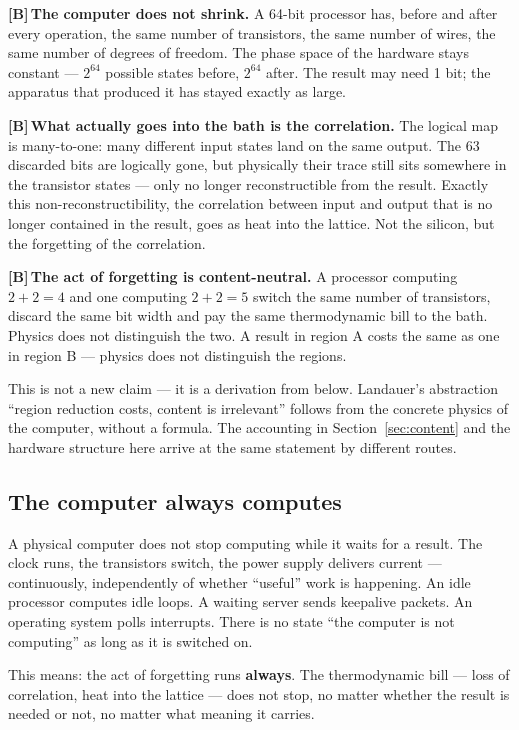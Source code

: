 \documentclass[11pt,a4paper]{article}
\newcommand{\LB}{\textcolor{layB}{\textbf{\footnotesize\textsf{[B]}}}\,}
\begin{document}
\LB \textbf{The computer does not shrink.} A 64-bit processor has, before and
after every operation, the same number of transistors, the same number of wires,
the same number of degrees of freedom. The phase space of the hardware stays
constant --- $2^{64}$ possible states before, $2^{64}$ after. The result may need
1 bit; the apparatus that produced it has stayed exactly as large.

\LB \textbf{What actually goes into the bath is the correlation.} The logical map
is many-to-one: many different input states land on the same output. The 63
discarded bits are logically gone, but physically their trace still sits somewhere
in the transistor states --- only no longer reconstructible from the result.
Exactly this non-reconstructibility, the correlation between input and output that
is no longer contained in the result, goes as heat into the lattice. Not the
silicon, but the forgetting of the correlation.

\LB \textbf{The act of forgetting is content-neutral.} A processor computing
$2+2=4$ and one computing $2+2=5$ switch the same number of transistors, discard
the same bit width and pay the same thermodynamic bill to the bath. Physics does
not distinguish the two. A result in region A costs the same as one in region B
--- physics does not distinguish the regions.

This is not a new claim --- it is a derivation from below. Landauer's abstraction
“region reduction costs, content is irrelevant” follows from the concrete physics
of the computer, without a formula. The accounting in Section~\ref{sec:content}
and the hardware structure here arrive at the same statement by different routes.

\subsection{The computer always computes}
\label{sec:always}

A physical computer does not stop computing while it waits for a result. The clock
runs, the transistors switch, the power supply delivers current --- continuously,
independently of whether “useful” work is happening. An idle processor computes
idle loops. A waiting server sends keepalive packets. An operating system polls
interrupts. There is no state “the computer is not computing” as long as it is
switched on.

This means: the act of forgetting runs \textbf{always}. The thermodynamic bill ---
loss of correlation, heat into the lattice --- does not stop, no matter whether
the result is needed or not, no matter what meaning it carries.
\end{document}
